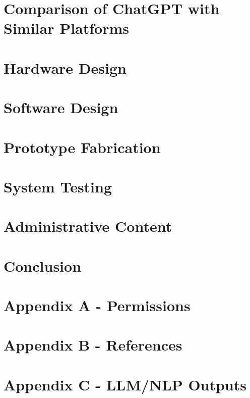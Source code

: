 \documentclass[12pt, letterpaper]{article}
\begin{document}
\begin{singlespace}
	\section{Comparison of ChatGPT with Similar Platforms}
	
	
	\newpage
	\section{Hardware Design}
	
	
	
	
	
	\newpage
	\section{Software Design}
	
	
	
	
	
	\newpage
	\section{Prototype Fabrication}
	
	
	\newpage
	\section{System Testing}
	
	
	\newpage
	\section{Administrative Content}
	
	
		
	\newpage
	\section{Conclusion}
	
	\newpage
	\section{Appendix A - Permissions}
	
	
	\newpage
	\section{Appendix B - References}
	
	
	\newpage
	\section{Appendix C - LLM/NLP Outputs}
	
	
	\end{singlespace}
\end{document}
